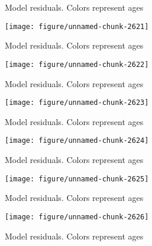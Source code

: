 \documentclass[a4paper]{article}\usepackage{graphicx, color}
\makeatletter
\def\maxwidth{ %
  \ifdim\Gin@nat@width>\linewidth
    \linewidth
  \else
    \Gin@nat@width
  \fi
}
\newenvironment{knitrout}{}{} %
\makeatother
\begin{document}
\begin{knitrout}
\begin{figure}[H]
\caption[Model residuals]{Model residuals. Colors represent ages\label{fig:unnamed-chunk-2620}}
\end{figure}
\begin{figure}[H]


{\centering \texttt{[image: figure/unnamed-chunk-2621]} 

}

\caption[Model residuals]{Model residuals. Colors represent ages\label{fig:unnamed-chunk-2621}}
\end{figure}
\begin{figure}[H]


{\centering \texttt{[image: figure/unnamed-chunk-2622]} 

}

\caption[Model residuals]{Model residuals. Colors represent ages\label{fig:unnamed-chunk-2622}}
\end{figure}
\begin{figure}[H]


{\centering \texttt{[image: figure/unnamed-chunk-2623]} 

}

\caption[Model residuals]{Model residuals. Colors represent ages\label{fig:unnamed-chunk-2623}}
\end{figure}
\begin{figure}[H]


{\centering \texttt{[image: figure/unnamed-chunk-2624]} 

}

\caption[Model residuals]{Model residuals. Colors represent ages\label{fig:unnamed-chunk-2624}}
\end{figure}
\begin{figure}[H]


{\centering \texttt{[image: figure/unnamed-chunk-2625]} 

}

\caption[Model residuals]{Model residuals. Colors represent ages\label{fig:unnamed-chunk-2625}}
\end{figure}
\begin{figure}[H]


{\centering \texttt{[image: figure/unnamed-chunk-2626]} 

}

\caption[Model residuals]{Model residuals. Colors represent ages\label{fig:unnamed-chunk-2626}}
\end{figure}
\begin{figure}[H]



\end{figure}
\end{knitrout}
\end{document}
